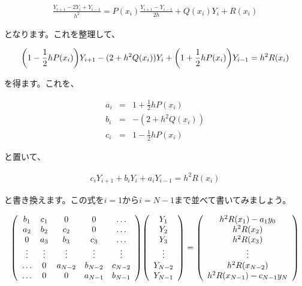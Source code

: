 \begin{eqnarray}
    \frac{Y_{i+1}-2Y_i+Y_{i-1}}{h^2}=P(x_i)\frac{Y_{i+1}-Y_{i-1}}{2h}+Q(x_i)Y_i+R(x_i)
\end{eqnarray}

\noindent
となります。これを整理して、

\begin{eqnarray}
    \pqty{1-\frac{1}{2}hP(x_i)}Y_{i+1}-(2+h^2Q(x_i))Y_i+\pqty{1+\frac{1}{2}hP(x_i)}Y_{i-1}=h^2R(x_i)
\end{eqnarray}

\noindent
を得ます。これを、

\begin{eqnarray}
    a_i&=&1+\frac{1}{2}hP(x_i) \\
    b_i&=&-(2+h^2Q(x_i)) \\
    c_i&=&1-\frac{1}{2}hP(x_i)
\end{eqnarray}

\noindent
と置いて、

\begin{eqnarray}
    c_iY_{i+1}+b_iY_i+a_iY_{i-1}=h^2R(x_i)
\end{eqnarray}

\noindent
と書き換えます。この式を$i=1$から$i=N-1$まで並べて書いてみましょう。

\begin{eqnarray}
    \pqty{\begin{array}{ccccc}
        b_1 & c_1 & 0 & 0 & \hdots \\
        a_2 & b_2 & c_2 & 0 & \hdots \\
        0 & a_3 & b_3 & c_3 & \hdots \\
        \vdots & \vdots & \vdots & \vdots & \vdots \\
        \hdots & 0 & a_{N-2} & b_{N-2} & c_{N-2} \\
        \hdots & 0 & 0 & a_{N-1} & b_{N-1}
    \end{array}}
    \pqty{\begin{array}{c}
        Y_1 \\
        Y_2 \\
        Y_3 \\
        \vdots \\
        Y_{N-2} \\
        Y_{N-1}
    \end{array}}
    =\pqty{\begin{array}{c}
        h^2R(x_1)-a_1y_0 \\
        h^2R(x_2) \\
        h^2R(x_3) \\
        \vdots \\
        h^2R(x_{N-2}) \\
        h^2R(x_{N-1})-c_{N-1}y_N
    \end{array}}
    \label{eq:difference-liner-final}
\end{eqnarray}

